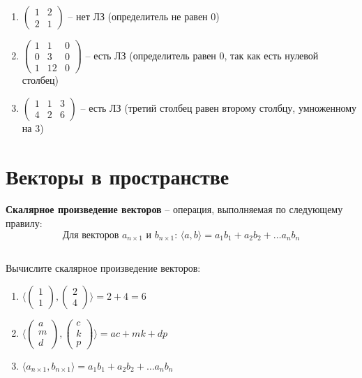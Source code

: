 \documentclass[11pt, a4paper]{extarticle}
\begin{document}
\begin{enumerate}[label=\alph*)]
		\item $\begin{pmatrix}
		1 & 2 \\
		2 & 1
		\end{pmatrix}$ – нет ЛЗ (определитель не равен 0)
		
		\item $\begin{pmatrix}
		1 & 1 & 0 \\
		0 & 3 & 0 \\
		1 & 12 & 0
		\end{pmatrix}$ – есть ЛЗ (определитель равен 0, так как есть нулевой столбец)
		
		\item $\begin{pmatrix}
		1 & 1 & 3 \\
		4 & 2 & 6
		\end{pmatrix}$ – есть ЛЗ (третий столбец равен второму столбцу, умноженному на 3)
	\end{enumerate}

	
\section{Векторы в пространстве}

	\textbf{Скалярное произведение векторов} – операция, выполняемая по следующему правилу:
	\[
	\text{Для векторов $a_{n\times1}$ и $b_{n\times1}$: } \langle a, b \rangle = a_1b_1 + a_2b_2 + \ldots a_nb_n
	\] 
	
	\subsection{}
	Вычислите скалярное произведение векторов:
		\begin{enumerate}[label=\alph*)]
			
			\item $\langle\begin{pmatrix}
			1 \\ 1
			\end{pmatrix}, \begin{pmatrix}
			2 \\ 4
			\end{pmatrix}\rangle = 2 + 4 = 6$
			
			\item $\langle\begin{pmatrix}
			a \\ m \\ d
			\end{pmatrix}, \begin{pmatrix}
			c \\ k \\ p
			\end{pmatrix}\rangle = ac + mk + dp$
			
			\item $\langle a_{n\times1}, b_{n\times1}\rangle = a_1b_1 + a_2b_2 + \ldots a_nb_n$
		\end{enumerate}
	
\end{document}
